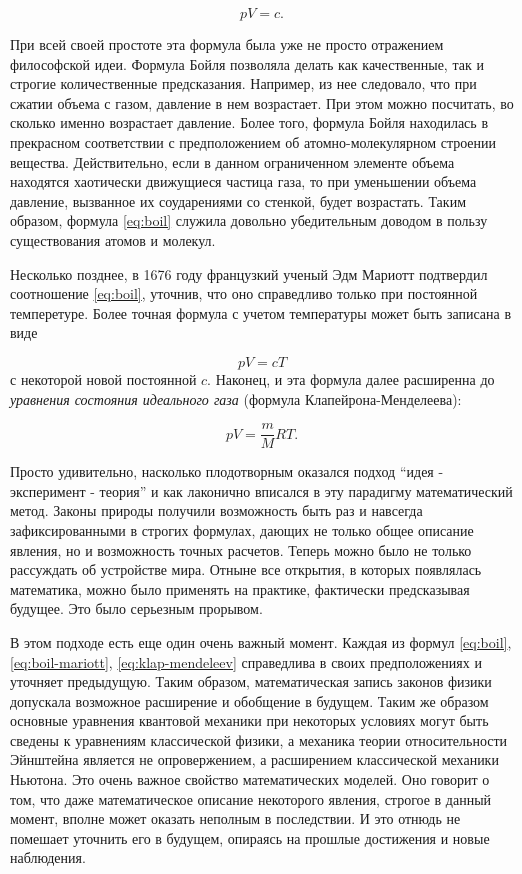 \begin{equation}\label{eq:boil}
pV = c.
\end{equation}

При всей своей простоте эта формула была уже не просто отражением философской идеи.
Формула Бойля позволяла делать как качественные, так и строгие количественные предсказания.
Например, из нее следовало, что при сжатии объема с газом, давление в нем возрастает.
При этом можно посчитать, во сколько именно возрастает давление.
Более того, формула Бойля находилась в прекрасном соответствии с предположением об атомно-молекулярном строении вещества.
Действительно, если в данном ограниченном элементе объема находятся хаотически движущиеся частица газа, то при уменьшении объема давление, вызванное их соударениями со стенкой, будет возрастать.
Таким образом, формула \ref{eq:boil} служила довольно убедительным доводом в пользу существования атомов и молекул.  

Несколько позднее, в 1676 году французкий ученый Эдм Мариотт подтвердил соотношение \ref{eq:boil}, уточнив, что оно справедливо только при постоянной темперетуре.
Более точная формула с учетом температуры может быть записана в виде

\begin{equation}\label{eq:boil-mariott}
pV = cT
\end{equation}
с некоторой новой постоянной $c$. Наконец, и эта формула далее расширенна до \textit{уравнения состояния идеального газа} (формула Клапейрона-Менделеева):

\begin{equation}\label{eq:klap-mendeleev}
pV = \frac{m}{M}RT.
\end{equation}

Просто удивительно, насколько плодотворным оказался подход ``идея - эксперимент - теория'' и как лаконично вписался в эту парадигму математический метод.
Законы природы получили возможность быть раз и навсегда зафиксированными в строгих формулах, дающих не только общее описание явления, но и возможность точных расчетов.
Теперь можно было не только рассуждать об устройстве мира.
Отныне все открытия, в которых появлялась математика, можно было применять на практике, фактически предсказывая будущее.
Это было серьезным прорывом.

В этом подходе есть еще один очень важный момент.
Каждая из формул \ref{eq:boil}, \ref{eq:boil-mariott}, \ref{eq:klap-mendeleev} справедлива в своих предположениях и уточняет предыдущую.
Таким образом, математическая запись законов физики допускала возможное расширение и обобщение в будущем.
Таким же образом основные уравнения квантовой механики при некоторых условиях могут быть сведены к уравнениям классической физики, а механика теории относительности Эйнштейна является не опровержением, а расширением классической механики Ньютона. 
Это очень важное свойство математических моделей.
Оно говорит о том, что даже математическое описание некоторого явления, строгое в данный момент, вполне может оказать неполным в последствии.
И это отнюдь не помешает уточнить его в будущем, опираясь на прошлые достижения и новые наблюдения.

